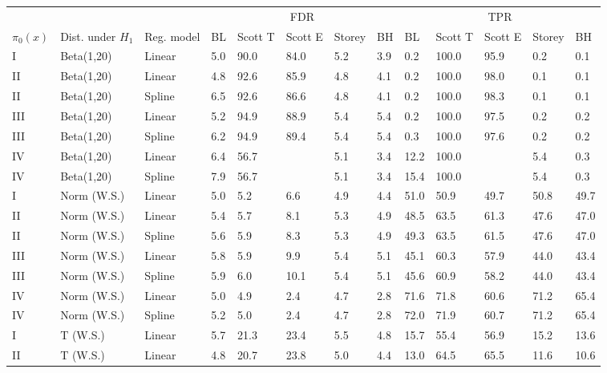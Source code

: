 \documentclass{article}\usepackage[]{graphicx}\usepackage[]{color}
\begin{document}
\begin{table}[ht]
\centering
\begin{tabular}{lll|lllll|lllll}
  \hline
  &&& \multicolumn{5}{c}{FDR} & \multicolumn{5}{c}{TPR}\\
 $\pi_0(x)$ &  Dist. under $H_1$ & Reg. model & BL & Scott T & Scott E & Storey & BH & BL & Scott T & Scott E & Storey & BH    \\
 \hline
I & Beta(1,20) & Linear & 5.0 & 90.0 & 84.0 & 5.2 & 3.9 & 0.2 & 100.0 & 95.9 & 0.2 & 0.1 \\ 
  II & Beta(1,20) & Linear & 4.8 & 92.6 & 85.9 & 4.8 & 4.1 & 0.2 & 100.0 & 98.0 & 0.1 & 0.1 \\ 
  II & Beta(1,20) & Spline & 6.5 & 92.6 & 86.6 & 4.8 & 4.1 & 0.2 & 100.0 & 98.3 & 0.1 & 0.1 \\ 
  III & Beta(1,20) & Linear & 5.2 & 94.9 & 88.9 & 5.4 & 5.4 & 0.2 & 100.0 & 97.5 & 0.2 & 0.2 \\ 
  III & Beta(1,20) & Spline & 6.2 & 94.9 & 89.4 & 5.4 & 5.4 & 0.3 & 100.0 & 97.6 & 0.2 & 0.2 \\ 
  IV & Beta(1,20) & Linear & 6.4 & 56.7 &  & 5.1 & 3.4 & 12.2 & 100.0 &  & 5.4 & 0.3 \\ 
  IV & Beta(1,20) & Spline & 7.9 & 56.7 &  & 5.1 & 3.4 & 15.4 & 100.0 &  & 5.4 & 0.3 \\ 
   \hline
I & Norm (W.S.) & Linear & 5.0 & 5.2 & 6.6 & 4.9 & 4.4 & 51.0 & 50.9 & 49.7 & 50.8 & 49.7 \\ 
  II & Norm (W.S.) & Linear & 5.4 & 5.7 & 8.1 & 5.3 & 4.9 & 48.5 & 63.5 & 61.3 & 47.6 & 47.0 \\ 
  II & Norm (W.S.) & Spline & 5.6 & 5.9 & 8.3 & 5.3 & 4.9 & 49.3 & 63.5 & 61.5 & 47.6 & 47.0 \\ 
  III & Norm (W.S.) & Linear & 5.8 & 5.9 & 9.9 & 5.4 & 5.1 & 45.1 & 60.3 & 57.9 & 44.0 & 43.4 \\ 
  III & Norm (W.S.) & Spline & 5.9 & 6.0 & 10.1 & 5.4 & 5.1 & 45.6 & 60.9 & 58.2 & 44.0 & 43.4 \\ 
  IV & Norm (W.S.) & Linear & 5.0 & 4.9 & 2.4 & 4.7 & 2.8 & 71.6 & 71.8 & 60.6 & 71.2 & 65.4 \\ 
  IV & Norm (W.S.) & Spline & 5.2 & 5.0 & 2.4 & 4.7 & 2.8 & 72.0 & 71.9 & 60.7 & 71.2 & 65.4 \\ 
   \hline
I & T (W.S.) & Linear & 5.7 & 21.3 & 23.4 & 5.5 & 4.8 & 15.7 & 55.4 & 56.9 & 15.2 & 13.6 \\ 
  II & T (W.S.) & Linear & 4.8 & 20.7 & 23.8 & 5.0 & 4.4 & 13.0 & 64.5 & 65.5 & 11.6 & 10.6 \\ 

\end{tabular}
\end{table}
\end{document}
